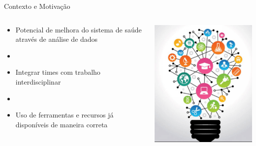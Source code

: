 \documentclass[10pt,brazil]{beamer}
\theoremstyle{definition}
\begin{document}
\begin{frame}[allowframebreaks]{Contexto e Motivação}
\begin{columns}
      \begin{column}{0.5\textwidth}
  \begin{itemize}
    \item[] Potencial de melhora do sistema de saúde através de análise de dados
    \item[]
    \item[] Integrar times com trabalho interdisciplinar
    \item[]
    \item[] Uso de ferramentas e recursos já disponíveis de maneira correta
  \end{itemize}
    \end{column}
    \begin{column}{0.5\textwidth}
      \begin{center}
        \includegraphics[width=1\textwidth]{interdisciplinar.png}
      \end{center}
      \end{column}
  \end{columns}
\end{frame}
\end{document}
